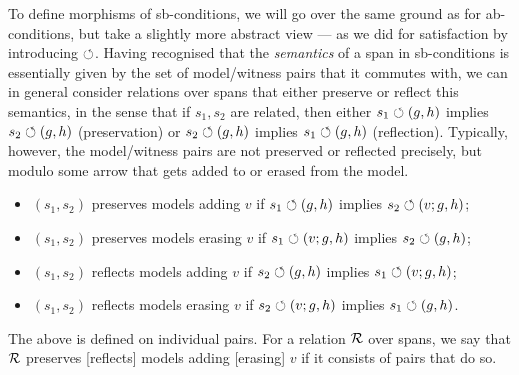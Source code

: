 To define morphisms of sb-conditions, we will go over the same ground as for ab-conditions, but take a slightly more abstract view --- as we did for satisfaction by introducing $\circlearrowleft$. Having recognised that the \emph{semantics} of a span in sb-conditions is essentially given by the set of model/witness pairs that it commutes with, we can in general consider relations over spans that either preserve or reflect this semantics, in the sense that if $s_1,s_2$ are related, then either $s_1\circlearrowleft (g,h)$ implies $s_2\circlearrowleft (g,h)$ (preservation) or $s_2\circlearrowleft (g,h)$ implies $s_1\circlearrowleft (g,h)$ (reflection). Typically, however, the model/witness pairs are not preserved or reflected precisely, but modulo some arrow that gets added to or erased from the model.
%
\begin{itemize}
\item $(s_1,s_2)$ preserves models adding $v$ if $s_1\circlearrowleft (g,h)$ implies $s_2\circlearrowleft (v;g,h)$;
\item $(s_1,s_2)$ preserves models erasing $v$ if $s_1\circlearrowleft (v;g,h)$ implies $s_2\circlearrowleft (g,h)$;
\item $(s_1,s_2)$ reflects models adding $v$ if $s_2\circlearrowleft (g,h)$ implies $s_1\circlearrowleft (v;g,h)$;
\item $(s_1,s_2)$ reflects models erasing $v$ if $s_2\circlearrowleft (v;g,h)$ implies $s_1\circlearrowleft (g,h)$.
\end{itemize}
%
The above is defined on individual pairs. For a relation $\mathcal{R}$ over spans, we say that $\mathcal{R}$ preserves [reflects] models adding [erasing] $v$ if it consists of pairs that do so.

